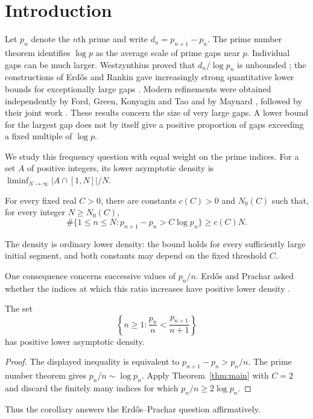 \begin{abstract}
For every fixed $C>0$, we prove that a positive proportion of consecutive
prime gaps exceed $C\log p$, where $p$ is the smaller prime. The proportion
is bounded below for every sufficiently large initial segment of the
prime sequence, with a constant depending on $C$. It follows that the
indices at which $p_n/n$ increases have positive lower asymptotic density,
answering a question of Erd\H{o}s and Prachar.
\end{abstract}

\section{Introduction}

Let $p_n$ denote the $n$th prime and write $d_n=p_{n+1}-p_n$.
The prime number theorem identifies $\log p$ as the average scale of
prime gaps near $p$. Individual gaps can be much larger.
Westzynthius proved that $d_n/\log p_n$ is unbounded
\cite{Westzynthius1931}; the constructions of Erd\H{o}s and Rankin
gave increasingly strong quantitative lower bounds for exceptionally
large gaps \cite{Erdos1935,Rankin1938}.
Modern refinements were obtained independently by Ford, Green,
Konyagin and Tao and by Maynard
\cite{FordGreenKonyaginTao2016,Maynard2016Large}, followed by their
joint work \cite{FordGreenKonyaginMaynardTao2018}.
These results concern the size of very large gaps. A lower bound for
the largest gap does not by itself give a positive proportion of
gaps exceeding a fixed multiple of $\log p$.

We study this frequency question with equal weight on the prime
indices. For a set $A$ of positive integers, its lower asymptotic
density is $\liminf_{N\to\infty}|A\cap[1,N]|/N$.

\begin{theorem}\label{thm:main}
For every fixed real $C>0$, there are constants $c(C)>0$ and $N_0(C)$
such that, for every integer $N\ge N_0(C)$,
\[
 \#\{1\le n\le N:p_{n+1}-p_n>C\log p_n\}\ge c(C)N.
\]
\end{theorem}

The density is ordinary lower density: the bound holds for every
sufficiently large initial segment, and both constants may depend
on the fixed threshold $C$.

One consequence concerns successive values of $p_n/n$.
Erd\H{o}s and Prachar asked whether the indices at which this ratio
increases have positive lower density \cite[p.~256]{ErdosPrachar1962}.

\begin{corollary}\label{cor:ratios}
The set
\[
 \left\{n\ge1:\frac{p_n}{n}<\frac{p_{n+1}}{n+1}\right\}
\]
has positive lower asymptotic density.
\end{corollary}
\begin{proof}
The displayed inequality is equivalent to
$p_{n+1}-p_n>p_n/n$.
The prime number theorem gives $p_n/n\sim\log p_n$.
Apply Theorem~\ref{thm:main} with $C=2$ and discard the finitely many
indices for which $p_n/n\ge2\log p_n$.
\end{proof}

Thus the corollary answers the Erd\H{o}s--Prachar question affirmatively.
